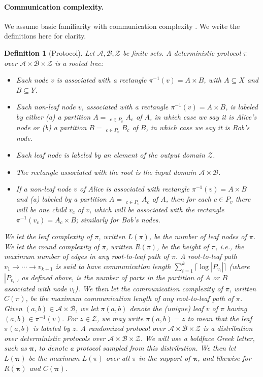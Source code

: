 \documentclass[10pt,a4paper]{article}
\newtheorem{definition}[theorem]{Definition}
\begin{document}
\paragraph{Communication complexity.} We assume basic familiarity with communication complexity \cite{ref38}. We write the definitions here for clarity.
\setcounter{theorem}{4}
\begin{definition}[Protocol]\label{def:protocol}
Let $\mathcal A,\mathcal B,\mathcal Z$ be finite sets. A deterministic protocol $\pi$ over $\mathcal A\times\mathcal B\times\mathcal Z$ is a rooted tree:
\begin{itemize}
\item Each node $v$ is associated with a rectangle $\pi^{-1}(v)=A\times B$, with $A\subseteq X$ and $B\subseteq Y$.
\item Each non-leaf node $v$, associated with a rectangle $\pi^{-1}(v)=A\times B$, is labeled by either (a) a partition $A=\mathop{\dot\bigcup}_{c\in P_v} A_c$ of $A$, in which case we say it is Alice's node or (b) a partition $B=\mathop{\dot\bigcup}_{c\in P_v} B_c$ of $B$, in which case we say it is Bob's node.
\item Each leaf node is labeled by an element of the output domain $\mathcal Z$.
\item The rectangle associated with the root is the input domain $\mathcal A\times\mathcal B$.
\item If a non-leaf node $v$ of Alice is associated with rectangle $\pi^{-1}(v)=A\times B$ and (a) labeled by a partition $A=\mathop{\dot\bigcup}_{c\in P_v} A_c$ of $A$, then for each $c\in P_v$ there will be one child $v_c$ of $v$, which will be associated with the rectangle $\pi^{-1}(v_c)=A_c\times B$; similarly for Bob's nodes.
\end{itemize}
We let the leaf complexity of $\pi$, written $L(\pi)$, be the number of leaf nodes of $\pi$. We let the round complexity of $\pi$, written $R(\pi)$, be the height of $\pi$, i.e., the maximum number of edges in any root-to-leaf path of $\pi$.
A root-to-leaf path $v_1\to\cdots\to v_{k+1}$ is said to have communication length $\sum_{i=1}^k\lceil\log|P_{v_i}|\rceil$ (where $|P_{v_i}|$, as defined above, is the number of parts in the partition of $A$ or $B$ associated with node $v_i$). We then let the communication complexity of $\pi$, written $C(\pi)$, be the maximum communication length of any root-to-leaf path of $\pi$.
Given $(a,b)\in\mathcal A\times\mathcal B$, we let $\pi(a,b)$ denote the (unique) leaf $v$ of $\pi$ having $(a,b)\in\pi^{-1}(v)$. For $z\in\mathcal Z$, we may write $\pi(a,b)=z$ to mean that the leaf $\pi(a,b)$ is labeled by $z$.
A randomized protocol over $\mathcal A\times\mathcal B\times\mathcal Z$ is a distribution over deterministic protocols over $\mathcal A\times\mathcal B\times\mathcal Z$. We will use a boldface Greek letter, such as $\boldsymbol\pi$, to denote a protocol sampled from this distribution. We then let $L(\boldsymbol\pi)$ be the maximum $L(\pi)$ over all $\pi$ in the support of $\boldsymbol\pi$, and likewise for $R(\boldsymbol\pi)$ and $C(\boldsymbol\pi)$.
\end{definition}
\end{document}
